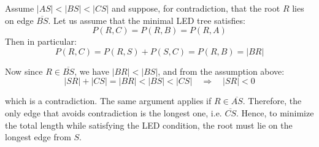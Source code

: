 \documentclass[12pt]{article}
\newcommand{\Prize}[2]{P(#1,#2)}
\begin{document}
	Assume \( |AS| < |BS| < |CS| \) and suppose, for contradiction, that the root \( R \) lies on edge \( \overline{BS} \).  
	Let us assume that the minimal LED tree satisfies:
	\[
	\Prize{R}{C} = \Prize{R}{B} = \Prize{R}{A}
	\]
	Then in particular:
	\[
	\Prize{R}{C} = \Prize{R}{S} + \Prize{S}{C} = \Prize{R}{B} = |BR|
	\]
	
	Now since \( R \in \overline{BS} \), we have \( |BR| < |BS| \), and from the assumption above:
	\[
	|SR| + |CS| = |BR| < |BS| < |CS|
	\quad \Rightarrow \quad |SR| < 0
	\]
	
	which is a contradiction.  
	The same argument applies if \( R \in \overline{AS} \).  
	Therefore, the only edge that avoids contradiction is the longest one, i.e. \( \overline{CS} \).  
	Hence, to minimize the total length while satisfying the LED condition, the root must lie on the longest edge from \( S \).
	
	
	
\end{document}
